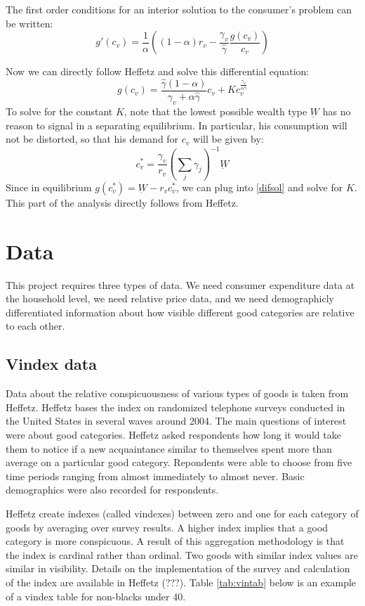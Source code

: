 \documentclass{article}
\begin{document}
The first order conditions for an interior solution to the consumer's problem can be written:
\begin{equation}
g'(c_v) = \frac{1}{\alpha}\left( \left( 1-\alpha\right) r_v - \frac{\gamma_v}{\hat{\gamma}}\frac{g(c_v)}{c_v }\right)
\end{equation}

Now we can directly follow Heffetz and solve this differential equation:
\begin{equation}
	\label{difsol}
	g(c_v) = \frac{\hat{\gamma}\left(1-\alpha\right)}{\gamma_v +\alpha \hat{\gamma}} c_v + K c_v^{\frac{\gamma_v}{\alpha \hat{\gamma}}}
\end{equation}
To solve for the constant $K$, note that the lowest possible wealth type $\underbar{W}$ has no reason to signal in a separating equilibrium.
In particular, his consumption will not be distorted, so that his demand for $c_v$ will be given by:
\[
c_v^* = \frac{\gamma_v}{r_v}\left(\sum_{j} \gamma_j\right)^{-1}\underbar{W} 
\]
Since in equilibrium $g(c_v^*) = \underbar{W} - r_v c_v^*$, we can plug into \eqref{difsol} and solve for $K$.
This part of the analysis directly follows from Heffetz.
\section{Data}
This project requires three types of data.  We need consumer expenditure data at the household level, we need relative price data, and we need demographicly differentiated information about how visible different good categories are relative to each other. 
\subsection{Vindex data}
Data about the relative  conspicuousness of  various types of goods is taken from Heffetz.  
Heffetz bases the index on randomized telephone surveys conducted in the United States in several waves around 2004.
The main questions of interest were about good categories.
Heffetz asked respondents how long it would take them to notice if a new acquaintance similar to themselves spent more than average on a particular good category.
Repondents were able to choose from five time periods ranging from almost immediately to almost never.  
Basic demographics were also recorded for respondents.  

Heffetz create indexes (called vindexes) between zero and one for each category of goods by averaging over survey results.  
A higher index implies that a good category is  more conspicuous. 
A result of this aggregation methodology is that the index is cardinal rather than ordinal.  Two goods with similar index values are similar in visibility.  Details on the implementation of the survey and calculation of the index are available in Heffetz (???).
Table \ref{tab:vintab} below is an example of a vindex table for non-blacks under 40.
\end{document}
